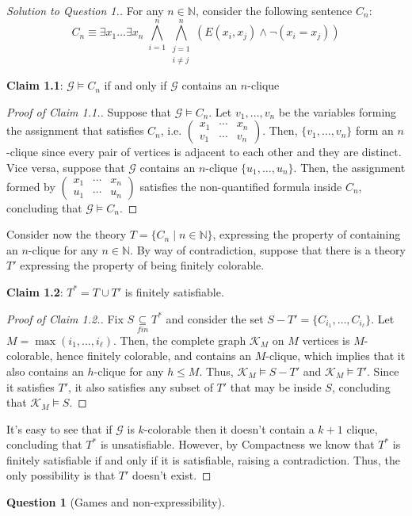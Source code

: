 \documentclass[12pt,a4paper]{report}
\newtheorem{question}{Question}
\theoremstyle{definition}
\newcommand{\N}{\mathbb{N}}         %
\begin{document}
    \begin{proof}[Solution to Question 1.]
        For any $n \in \N$, consider the following sentence $C_n$:
        \[C_n \equiv \exists x_1 \ldots \exists x_n \; \bigwedge_{i = 1}^n \bigwedge_{\substack{j = 1 \\i \neq j}}^n (E(x_i, x_j) \land \lnot (x_i = x_j))\] 

        \textbf{Claim 1.1}: $\mathcal{G} \models C_n$ if and only if $\mathcal{G}$ contains an $n$-clique

        \begin{proof}[Proof of Claim 1.1.]
            Suppose that $\mathcal{G} \models C_n$. Let $v_1, \ldots, v_n$ be the variables forming the assignment that satisfies $C_n$, i.e. $\left ( \begin{matrix}
                x_1 & \cdots & x_n \\ v_1 & \cdots & v_n
            \end{matrix} \right )$. Then, $\{v_1, \ldots, v_n\}$ form an $n$-clique since every pair of vertices is adjacent to each other and they are distinct. Vice versa, suppose that $\mathcal{G}$ contains an $n$-clique $\{u_1, \ldots, u_n\}$. Then, the assignment formed by $\left ( \begin{matrix}
                x_1 & \cdots & x_n \\ u_1 & \cdots & u_n 
            \end{matrix}\right )$ satisfies the non-quantified formula inside $C_n$, concluding that $\mathcal{G} \models C_n$.
        \end{proof}

        Consider now the theory $T = \{C_n \mid n \in \N\}$, expressing the property of containing an $n$-clique for any $n \in \N$. By way of contradiction, suppose that there is a theory $T'$ expressing the property of being finitely colorable.

        \textbf{Claim 1.2}: $T^* = T \cup T'$ is finitely satisfiable.
        
        \begin{proof}[Proof of Claim 1.2.]
            Fix $S \underset{fin}{\subseteq} T^*$ and consider the set $S - T' = \{C_{i_1}, \ldots, C_{i_\ell}\}$. Let $M = \max(i_1, \ldots, i_\ell)$. Then, the complete graph $\mathcal{K}_M$ on $M$ vertices is $M$-colorable, hence finitely colorable, and contains an $M$-clique, which implies that it also contains an $h$-clique for any $h \leq M$. Thus, $\mathcal{K}_M \models S-T'$ and $\mathcal{K}_M \models T'$. Since it satisfies $T'$, it also satisfies any subset of $T'$ that may be inside $S$, concluding that $\mathcal{K}_M \models S$. 
        \end{proof}
    
        It's easy to see that if $\mathcal{G}$ is $k$-colorable then it doesn't contain a $k+1$ clique, concluding that $T^*$ is unsatisfiable. However, by Compactness we know that $T^*$ is finitely satisfiable if and only if it is satisfiable, raising a contradiction. Thus, the only possibility is that $T'$ doesn't exist.
    \end{proof}

    \newpage

    \begin{question}[Games and non-expressibility]
        
    \end{question}
\end{document}
